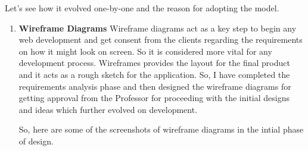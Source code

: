    Let's see how it evolved one-by-one and the reason for adopting the model. 
\begin{enumerate} 

    \item \textbf{Wireframe Diagrams}\newline
     Wireframe diagrams act as a key step to begin any web development and get consent from the clients regarding the requirements on how it might look on screen. So it is considered more vital for any development process. Wireframes provides the layout for the final product and it acts as a rough sketch for the application\cite{ngo2019android}.
     So, I have completed the requirements analysis phase and then designed the wireframe diagrams for getting approval from the Professor for proceeding with the initial designs and ideas which further evolved on development.
     
     So, here are some of the screenshots of wireframe diagrams in the intial phase of design.\newline
     

\end{enumerate}
